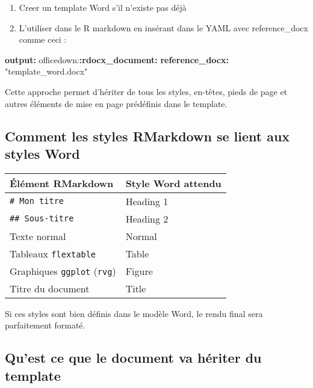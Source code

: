 \documentclass[
]{article}
\newenvironment{Shaded}{\begin{snugshade}}{\end{snugshade}}
\newcommand{\AttributeTok}[1]{\textcolor[rgb]{0.13,0.29,0.53}{#1}}
\newcommand{\FunctionTok}[1]{\textcolor[rgb]{0.13,0.29,0.53}{\textbf{#1}}}
\newcommand{\KeywordTok}[1]{\textcolor[rgb]{0.13,0.29,0.53}{\textbf{#1}}}
\newcommand{\StringTok}[1]{\textcolor[rgb]{0.31,0.60,0.02}{#1}}
\begin{document}
\begin{enumerate}
\def\labelenumi{\arabic{enumi}.}
\item
  Creer un template Word s'il n'existe pas déjà
\item
  L'utiliser dans le R markdown en insérant dans le YAML avec
  reference\_docx comme ceci :
\end{enumerate}

\begin{Shaded}
\begin{Highlighting}[]
\FunctionTok{output}\KeywordTok{:}\AttributeTok{ }
\AttributeTok{  officedown:}\FunctionTok{:rdocx\_document}\KeywordTok{:}
\AttributeTok{    }\FunctionTok{reference\_docx}\KeywordTok{:}\AttributeTok{ }\StringTok{"template\_word.docx"}
\end{Highlighting}
\end{Shaded}

Cette approche permet d'hériter de tous les styles, en-têtes, pieds de
page et autres éléments de mise en page prédéfinis dans le template.

\subsection{Comment les styles RMarkdown se lient aux styles
Word}\label{comment-les-styles-rmarkdown-se-lient-aux-styles-word}

\begin{longtable}[]{@{}ll@{}}
\toprule\noalign{}
Élément RMarkdown & Style Word attendu \\
\midrule\noalign{}
\endhead
\bottomrule\noalign{}
\endlastfoot
\texttt{\#\ Mon\ titre} & Heading 1 \\
\texttt{\#\#\ Sous-titre} & Heading 2 \\
Texte normal & Normal \\
Tableaux \texttt{flextable} & Table \\
Graphiques \texttt{ggplot} (\texttt{rvg}) & Figure \\
Titre du document & Title \\
\end{longtable}

Si ces styles sont bien définis dans le modèle Word, le rendu final sera
parfaitement formaté.

\subsection{Qu'est ce que le document va hériter du
template}\label{quest-ce-que-le-document-va-huxe9riter-du-template}
\end{document}

